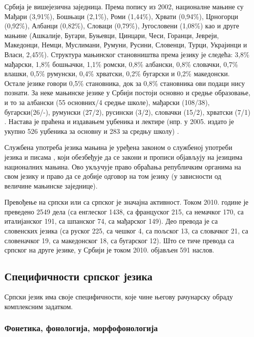 {\begin{multicols}{2}
Србија је вишејезична заједница. Према попису из 2002, националне мањине \cite{Ombudsman} су Мађари (3,91\%), Бошњаци (2,1\%), Роми (1,44\%), Хрвати (0,94\%), Црногорци (0,92\%), Албанци (0,82\%), Словаци (0,79\%), Југословени (1,08\%) као и друге мањине (Ашкалије, Бугари, Буњевци, Цинцари, Чеси, Горанци, Јевреји, Македонци, Немци, Муслимани, Румуни, Русини, Словенци, Турци, Украјинци и Власи, 2,45\%).  Структура мањинског становништва према језику је следећа: 3,8\% мађарски, 1,8\% бошњачки, 1,1\% ромски, 0,8\% албански, 0,8\% словачки, 0,7\% влашки, 0,5\% румунски, 0,4\% хрватски, 0,2\% бугарски и 0,2\% македонски. Остале језике говори 0,5\% становника, док за 0,8\% становника ови подаци нису познати. За неке мањинске језике у Србији постоји основно и средње образовање, и то за албански (55 основних/4 средње школе), мађарски (108/38), бугарски(26/-), румунски (27/2), русински (3/2), словачки (15/2), хрватски (7/1) \cite{GOD2010}. Настава је праћена и издавањем уџбеника и лектире (нпр. у 2005. издато је укупно 526 уџбеника за основну и 283 за средњу  школу) \cite{HDR}. 

Службена употреба језика мањина је уређена законом о службеној употреби језика и писама \cite{SGRS}, који обезбеђује да се закони и прописи објављују на језицима националних мањина. Ово укључује право обраћања републичким органима на свом језику и право да се добије одговор на том језику (у зависности од величине мањинске заједнице). 

Превођење на српски или са српског је значајна активност. Током 2010. године је преведено 2549 дела (са енглеског 1438, са француског 215, са немачког 170, са италијанског 191, са шпанског 74, са мађарског 149). Део превода је са словенских језика (са руског 225, са чешког 4, са пољског 13, са словачког 21, са словеначког 19, са македонског 18, са бугарског 12). Што се тиче превода са српског на друге језике, у Србији је током 2010. објављен 591 наслов.

\subsection {Специфичности српског језика}
  
Српски језик има своје специфичности, које чине његову рачунарску обраду комплексним задатком. 


\subsubsection {Фонетика, фонологија, морфофонологија}
  

\end{multicols}}
